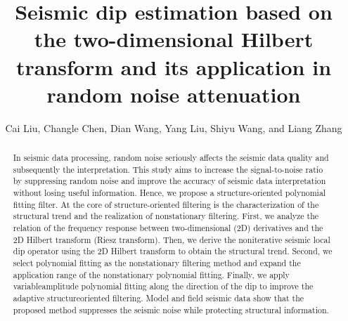 
\title{Seismic dip estimation based on the two-dimensional Hilbert transform and its application in random noise attenuation}


\renewcommand{\thefootnote}{\fnsymbol{footnote}}

\author{Cai Liu\/\footnotemark[1], Changle Chen\/\footnotemark[1], Dian Wang\/\footnotemark[3]\/\footnotemark[1], Yang Liu\/\footnotemark[1], Shiyu Wang\/\footnotemark[1], and Liang Zhang\/\footnotemark[2]}


\maketitle


\begin{abstract}
In seismic data processing, random noise seriously affects the seismic
data quality and subsequently the interpretation.  This study aims to
increase the signal-to-noise ratio by suppressing random noise and
improve the accuracy of seismic data interpretation without losing
useful information. Hence, we propose a structure-oriented polynomial
fitting filter. At the core of structure-oriented filtering is the
characterization of the structural trend and the realization of
nonstationary filtering. First, we analyze the relation of the
frequency response between two-dimensional (2D) derivatives and the 2D
Hilbert transform (Riesz transform). Then, we derive the noniterative
seismic local dip operator using the 2D Hilbert transform to obtain
the structural trend. Second, we select polynomial fitting as the
nonstationary filtering method and expand the application range of the
nonstationary polynomial fitting. Finally, we apply variableamplitude
polynomial fitting along the direction of the dip to improve the
adaptive structureoriented filtering. Model and field seismic data
show that the proposed method suppresses the seismic noise while
protecting structural information.
\end{abstract}

